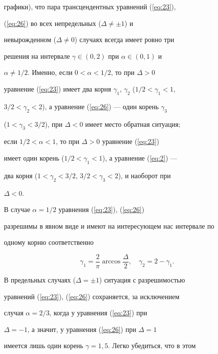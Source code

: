 графики), что пара трансцендентных уравнений (\ref{eq:23}),


(\ref{eq:26}) во всех непредельных ($\Delta\ne \pm 1$) и


невырожденном ($\Delta\ne 0$) случаях всегда имеет ровно три


решения на интервале $\gamma\in (0,2)$ при $\alpha\in (0,1)$ и


$\alpha\ne 1/2$. Именно, если $0<\alpha<1/2$, то при $\Delta>0$


уравнение (\ref{eq:23}) имеет два корня $\gamma_1$, $\gamma_2$ ($1/2<\gamma_1<1$,


$3/2<\gamma_2<2$), а уравнение (\ref{eq:26}) --- один корень $\gamma_3$


($1<\gamma_3 <3/2$), при $\Delta<0$ имеет место обратная ситуация;


если $1/2<\alpha<1$, то при $\Delta>0$ уравнение (\ref{eq:23})


имеет один корень ($1/2<\gamma_1<1$), а уравнение (\ref{eq:2}) ---


два корня ($1<\gamma_2<3/2$, $3/2<\gamma_3<2$), и наоборот при


$\Delta<0$.





В случае $\alpha=1/2$ уравнения (\ref{eq:23}), (\ref{eq:26})


разрешимы в явном виде и имеют на интересующем нас интервале по


одному корню соответственно


\begin{equation} %


\gamma_1=\frac{2}{\pi}\arccos\frac{\Delta}{2},\quad


\gamma_2=2-\gamma_1.


\label{eq:27}


\end{equation}





В предельных случаях ($\Delta=\pm 1$) ситуация с разрешимостью


уравнений (\ref{eq:23}), (\ref{eq:26}) сохраняется, за исключением


случая $\alpha=2/3$, когда у уравнения (\ref{eq:23}) при


$\Delta=-1$, а значит, у уравнения (\ref{eq:26}) при $\Delta=1$


имеется лишь один корень $\gamma=1{,}5$. Легко убедиться, что в этом


